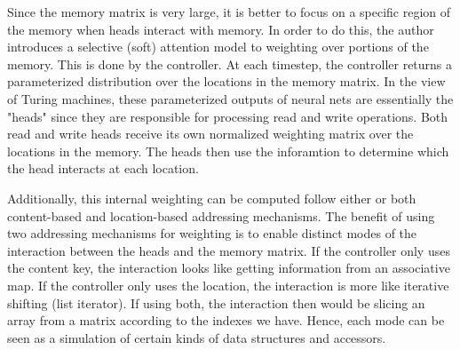 \documentclass[12pt,twoside]{article}
\theoremstyle{plain}
\theoremstyle{definition}
\theoremstyle{remark}
\begin{document}
%
%

Since the memory matrix is very large, it is better to focus on a specific region of the memory when heads interact with memory. In order to do this, the author introduces a selective (soft) attention model to weighting over portions of the memory. This is done by the controller. At each timestep, the controller returns a parameterized distribution over the locations in the memory matrix. In the view of Turing machines, these parameterized outputs of neural nets are essentially the "heads" since they are responsible for processing read and write operations. Both read and write heads receive its own normalized weighting matrix over the locations in the memory. The heads then use the inforamtion to determine which the head interacts at each location.


Additionally, this internal weighting can be computed follow either or both content-based and location-based addressing mechanisms. The benefit of using two addressing mechanisms for weighting is to enable distinct modes of the interaction between the heads and the memory matrix. If the controller only uses the content key, the interaction looks like getting information from an associative map. If the controller only uses the location, the interaction is more like iterative shifting (list iterator). If using both, the interaction then would be slicing an array from a matrix according to the indexes we have. Hence, each mode can be seen as a simulation of certain kinds of data structures and accessors.
\end{document}
